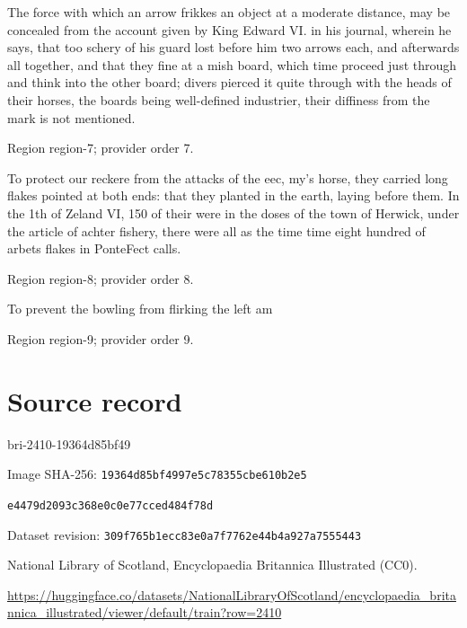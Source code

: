 \documentclass[11pt]{article}
\begin{document}
The force with which an arrow frikkes an object at a moderate distance, may be concealed from the account given by King Edward VI. in his journal, wherein he says, that too schery of his guard lost before him two arrows each, and afterwards all together, and that they fine at a mish board, which time proceed just through and think into the other board; divers pierced it quite through with the heads of their horses, the boards being well-defined industrier, their diffiness from the mark is not mentioned.
\par

{\scriptsize\color{gray} Region region-7; provider order 7.\par}
\medskip

To protect our reckere from the attacks of the eec, my’s horse, they carried long flakes pointed at both ends: that they planted in the earth, laying before them. In the 1th of Zeland VI, 150 of their were in the doses of the town of Herwick, under the article of achter fishery, there were all as the time time eight hundred of arbets flakes in PonteFect calls.
\par

{\scriptsize\color{gray} Region region-8; provider order 8.\par}
\medskip

To prevent the bowling from flirking the left am
\par

{\scriptsize\color{gray} Region region-9; provider order 9.\par}
\medskip
\newpage\section*{Source record}
bri-2410-19364d85bf49\par
Image SHA-256: \texttt{19364d85bf4997e5c78355cbe610b2e5}\par\texttt{e4479d2093c368e0c0e77cced484f78d}\par
Dataset revision: \texttt{309f765b1ecc83e0a7f7}\texttt{762e44b4a927a7555443}\par
National Library of Scotland, Encyclopaedia Britannica Illustrated (CC0).\par
\url{https://huggingface.co/datasets/NationalLibraryOfScotland/encyclopaedia_britannica_illustrated/viewer/default/train?row=2410}
\end{document}
